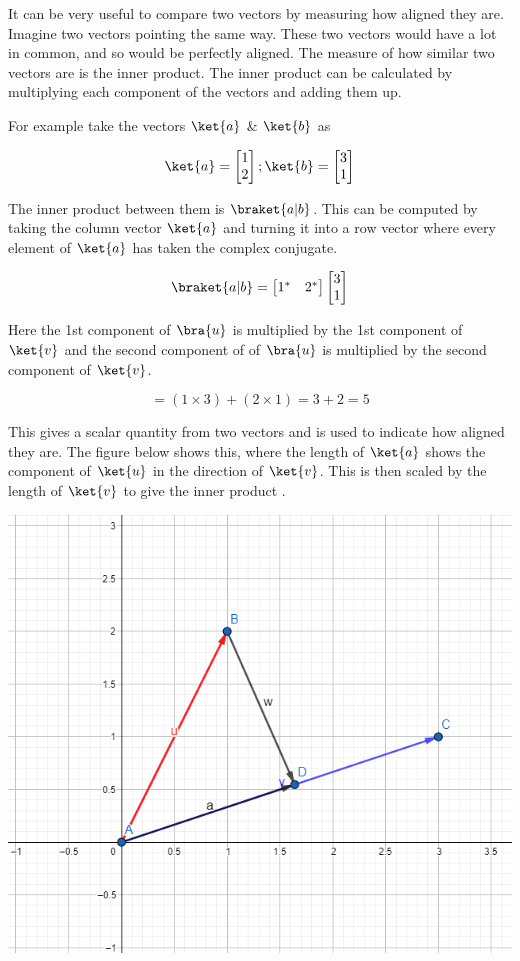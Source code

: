 \documentclass{book}
\begin{document}
It can be very useful to compare two vectors by measuring how aligned they are. Imagine two vectors pointing the same way. These two vectors would have a lot in common, and so would be perfectly aligned. The measure of how similar two vectors are is the inner product. The inner product can be calculated by multiplying each component of the vectors and adding them up. 

For example take the vectors $\ket{a}$ \& $\ket{b}$ as 

 $$
 \ket{a} = \begin{bmatrix} 1 \\ 2 \end{bmatrix} ;  \ket{b} = \begin{bmatrix} 3 \\ 1 \end{bmatrix} 
 $$

 The inner product between them is $\braket{a|b}$. This can be computed by taking the column vector $\ket{a}$ and turning it into a row vector where every element of $\ket{a}$ has taken the complex conjugate. 

 $$
\braket{a|b} = \begin{bmatrix} 1^* & 2^* \end{bmatrix}  \begin{bmatrix} 3 \\ 1 \end{bmatrix}
 $$

Here the 1st component of $\bra{u}$ is multiplied by the 1st component of $\ket{v}$ and the second component of of $\bra{u}$ is multiplied by the second component of $\ket{v}$.

$$
= (1 \times 3) + (2 \times 1) = 3 + 2 = 5 
$$

This gives a scalar quantity from two vectors and is used to indicate how aligned they are. The figure below shows this, where the length of $\ket{a}$ shows the component of $\ket{u}$ in the direction of $\ket{v}$. This is then scaled by the length of $\ket{v}$ to give the inner product . 

\includegraphics[scale=0.5]{images/Dot_product_visualisation.png}
\end{document}
